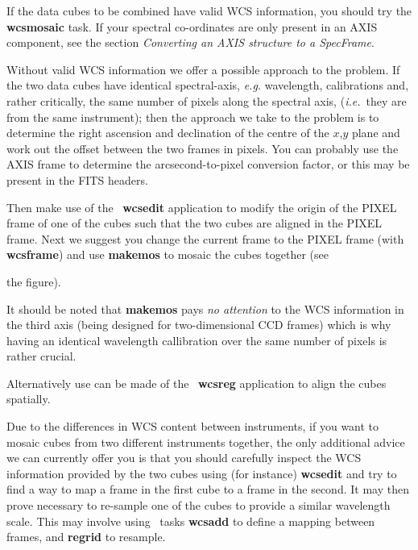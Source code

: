 \documentclass[twoside,11pt]{article}
\newcommand{\xref}[3]{#1}
\begin{document}
\begin{\htmlonly}
{If the data cubes to be combined have valid WCS information,
you should try the \xref{{\bf wcsmosaic}}{sun95}{WCSMOSAIC} task.
If your spectral co-ordinates are only present in an AXIS component,
see the section \xref{{\em Converting an AXIS structure to a
SpecFrame}}{sun95}{se_wcsuse}{}.

Without valid WCS information we offer a possible approach to the
problem.  If the two data cubes have identical spectral-axis,
\emph{e.g.} wavelength, calibrations and, rather critically, the same
number of pixels along the spectral axis, (\emph{i.e.}\ they are from
the same instrument); then the approach we take to the problem is to
determine the right ascension and declination of the centre of the
$x$,$y$ plane and work out the offset between the two frames in
pixels.  You can probably use the AXIS frame to determine the
arcsecond-to-pixel conversion factor, or this may be present in the
FITS headers.

Then make use of the \CCDPACK\ \xref{{\bf wcsedit}}{sun139}{WCSEDIT}
application to modify the origin of the PIXEL frame of one of the
cubes such that the two cubes are aligned in the PIXEL frame.  Next
we suggest you change the current frame to the PIXEL frame (with 
\xref{{\bf wcsframe}}{sun95}{WCSFRAME}) and use
\xref{{\bf makemos}}{sun139}{MAKEMOS} to mosaic the cubes together (see
\begin{htmlonly}
the figure).
\end{htmlonly}
  It should be noted that {\bf makemos} pays
{\em no attention} to the WCS information in the third axis (being
designed for two-dimensional CCD frames) which is why having an
identical wavelength callibration over the same number of pixels is
rather crucial.

Alternatively use can be made of the \CCDPACK\ 
\xref{{\bf wcsreg}}{sun139}{WCSREG} application to align the cubes spatially.

Due to the differences in WCS content between instruments, if you want
to mosaic cubes from two different instruments together, the only
additional advice we can currently offer you is that you should
carefully inspect the WCS information provided by the two cubes using
(for instance) \xref{{\bf wcsedit}}{sun139}{WCSEDIT} and try to find a way
to map a frame in the first cube to a frame in the second.  It may
then prove necessary to re-sample one of the cubes to provide a
similar wavelength scale.  This may involve using \KAPPA\ tasks
\xref{{\bf wcsadd}}{sun95}{WCSADD} to define a mapping between frames,
and \xref{{\bf regrid}}{sun95}{REGRID} to resample.

}
\end{\htmlonly}
\end{document}
